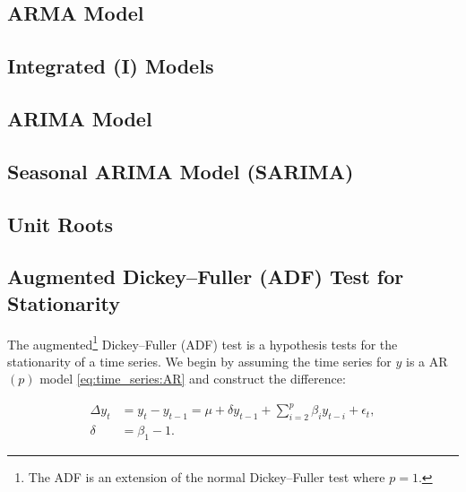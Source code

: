 \subsection{ARMA Model}
\label{additional:time_series:ARMA}
\subsection{Integrated (I) Models}
\label{additional:time_series:I}

\subsection{ARIMA Model}
\label{additional:time_series:ARIMA}

\subsection{Seasonal ARIMA Model (SARIMA)}
\label{additional:time_series:SARIMA}

\subsection{Unit Roots}
\label{additional:time_series:unit_root}

\subsection{Augmented Dickey--Fuller (ADF) Test for Stationarity}
\label{additional:time_series:ADF}

The augmented\footnote{The ADF is an extension of the normal Dickey--Fuller test where $p = 1$.} Dickey--Fuller (ADF) test
is a hypothesis tests for the stationarity of a time series.
We begin by assuming the time series for $y$ is a AR$\left(p\right)$ model \cref{eq:time_series:AR}
and construct the difference:

\begin{subequations}\label{eq:time_series:ADF}
\begin{align}
\Delta y_{t} &= y_{t} - y_{t-1} = \mu + \delta y_{t-1} + \sum_{i=2}^{p} \beta_{i} y_{t-i} + \epsilon_{t}, \label{eq:time_series:ADF:Delta_y} \\
\delta &= \beta_{1} - 1. \label{eq:time_series:ADF:delta}
\end{align}
\end{subequations}

